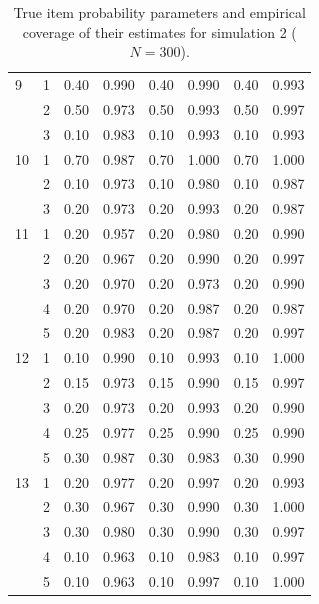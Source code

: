 \begin{table}[H]
\begin{tabular}{llcccccc}
  9 & 1 & 0.40 & 0.990 & 0.40 & 0.990 & 0.40 & 0.993 \\ 
   & 2 & 0.50 & 0.973 & 0.50 & 0.993 & 0.50 & 0.997 \\ 
   & 3 & 0.10 & 0.983 & 0.10 & 0.993 & 0.10 & 0.993 \\ 
  10 & 1 & 0.70 & 0.987 & 0.70 & 1.000 & 0.70 & 1.000 \\ 
   & 2 & 0.10 & 0.973 & 0.10 & 0.980 & 0.10 & 0.987 \\ 
   & 3 & 0.20 & 0.973 & 0.20 & 0.993 & 0.20 & 0.987 \\ 
  11 & 1 & 0.20 & 0.957 & 0.20 & 0.980 & 0.20 & 0.990 \\ 
   & 2 & 0.20 & 0.967 & 0.20 & 0.990 & 0.20 & 0.997 \\ 
   & 3 & 0.20 & 0.970 & 0.20 & 0.973 & 0.20 & 0.990 \\ 
   & 4 & 0.20 & 0.970 & 0.20 & 0.987 & 0.20 & 0.987 \\ 
   & 5 & 0.20 & 0.983 & 0.20 & 0.987 & 0.20 & 0.997 \\ 
  12 & 1 & 0.10 & 0.990 & 0.10 & 0.993 & 0.10 & 1.000 \\ 
   & 2 & 0.15 & 0.973 & 0.15 & 0.990 & 0.15 & 0.997 \\ 
   & 3 & 0.20 & 0.973 & 0.20 & 0.993 & 0.20 & 0.990 \\ 
   & 4 & 0.25 & 0.977 & 0.25 & 0.990 & 0.25 & 0.990 \\ 
   & 5 & 0.30 & 0.987 & 0.30 & 0.983 & 0.30 & 0.990 \\ 
  13 & 1 & 0.20 & 0.977 & 0.20 & 0.997 & 0.20 & 0.993 \\ 
   & 2 & 0.30 & 0.967 & 0.30 & 0.990 & 0.30 & 1.000 \\ 
   & 3 & 0.30 & 0.980 & 0.30 & 0.990 & 0.30 & 0.997 \\ 
   & 4 & 0.10 & 0.963 & 0.10 & 0.983 & 0.10 & 0.997 \\ 
   & 5 & 0.10 & 0.963 & 0.10 & 0.997 & 0.10 & 1.000 \\ 
   \bottomrule
\end{tabular}
\caption{True item probability parameters and empirical coverage of their estimates for simulation 2 ($N = 300$).} 
\label{table:sim2_item_prob_coverage_N300}
\end{table}
